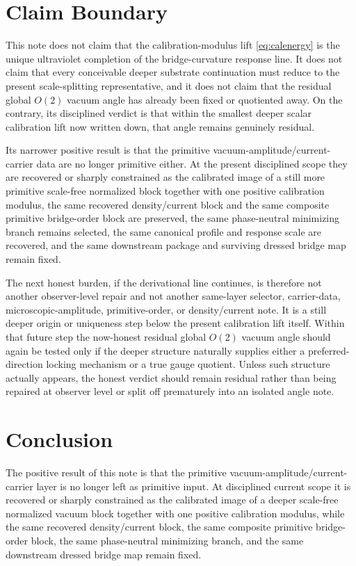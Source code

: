 \documentclass[11pt]{article}
\begin{document}
\section{Claim Boundary}

This note does not claim that the calibration-modulus lift \eqref{eq:calenergy} is the unique ultraviolet completion of the bridge-curvature response line. It does not claim that every conceivable deeper substrate continuation must reduce to the present scale-splitting representative, and it does not claim that the residual global \(O(2)\) vacuum angle has already been fixed or quotiented away. On the contrary, its disciplined verdict is that within the smallest deeper scalar calibration lift now written down, that angle remains genuinely residual.

Its narrower positive result is that the primitive vacuum-amplitude/current-carrier data are no longer primitive either. At the present disciplined scope they are recovered or sharply constrained as the calibrated image of a still more primitive scale-free normalized block together with one positive calibration modulus, the same recovered density/current block and the same composite primitive bridge-order block are preserved, the same phase-neutral minimizing branch remains selected, the same canonical profile and response scale are recovered, and the same downstream package and surviving dressed bridge map remain fixed.

The next honest burden, if the derivational line continues, is therefore not another observer-level repair and not another same-layer selector, carrier-data, microscopic-amplitude, primitive-order, or density/current note. It is a still deeper origin or uniqueness step below the present calibration lift itself. Within that future step the now-honest residual global \(O(2)\) vacuum angle should again be tested only if the deeper structure naturally supplies either a preferred-direction locking mechanism or a true gauge quotient. Unless such structure actually appears, the honest verdict should remain residual rather than being repaired at observer level or split off prematurely into an isolated angle note.

\section{Conclusion}

The positive result of this note is that the primitive vacuum-amplitude/current-carrier layer is no longer left as primitive input. At disciplined current scope it is recovered or sharply constrained as the calibrated image of a deeper scale-free normalized vacuum block together with one positive calibration modulus, while the same recovered density/current block, the same composite primitive bridge-order block, the same phase-neutral minimizing branch, and the same downstream dressed bridge map remain fixed.
\end{document}
